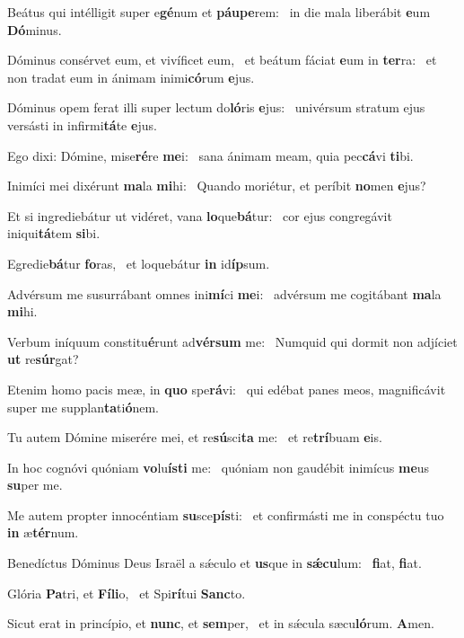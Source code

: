 \item Beátus qui intélligit super e\textbf{gé}num et \textbf{páu}\textbf{pe}rem:~\psstar{} in die mala liberábit \textbf{e}um \textbf{Dó}minus.
\item Dóminus consérvet eum, et vivíficet eum,~\pscross{} et beátum fáciat \textbf{e}um in \textbf{ter}ra:~\psstar{} et non tradat eum in ánimam inimi\textbf{có}rum \textbf{e}jus.
\item Dóminus opem ferat illi super lectum do\textbf{ló}ris \textbf{e}jus:~\psstar{} univérsum stratum ejus versásti in infirmi\textbf{tá}te \textbf{e}jus.
\item Ego dixi: Dómine, mise\textbf{ré}re \textbf{me}i:~\psstar{} sana ánimam meam, quia pec\textbf{cá}vi \textbf{ti}bi.
\item Inimíci mei dixérunt \textbf{ma}la \textbf{mi}hi:~\psstar{} Quando moriétur, et períbit \textbf{no}men \textbf{e}jus?
\item Et si ingrediebátur ut vidéret, vana \textbf{lo}que\textbf{bá}tur:~\psstar{} cor ejus congregávit iniqui\textbf{tá}tem \textbf{si}bi.
\item Egredie\textbf{bá}tur \textbf{fo}ras,~\psstar{} et loquebátur \textbf{in} id\textbf{íp}sum.
\item Advérsum me susurrábant omnes ini\textbf{mí}ci \textbf{me}i:~\psstar{} advérsum me cogitábant \textbf{ma}la \textbf{mi}hi.
\item Verbum iníquum constitu\textbf{é}runt ad\textbf{vér}\textbf{sum} me:~\psstar{} Numquid qui dormit non adjíciet \textbf{ut} re\textbf{súr}gat?
\item Etenim homo pacis meæ, in \textbf{quo} spe\textbf{rá}vi:~\psstar{} qui edébat panes meos, magnificávit super me supplan\textbf{ta}ti\textbf{ó}nem.
\item Tu autem Dómine miserére mei, et re\textbf{sú}sci\textbf{ta} me:~\psstar{} et re\textbf{trí}buam \textbf{e}is.
\item In hoc cognóvi quóniam \textbf{vo}lu\textbf{ís}\textbf{ti} me:~\psstar{} quóniam non gaudébit inimícus \textbf{me}us \textbf{su}per me.
\item Me autem propter innocéntiam \textbf{su}sce\textbf{pís}ti:~\psstar{} et confirmásti me in conspéctu tuo \textbf{in} æ\textbf{tér}num.
\item Benedíctus Dóminus Deus Israël a sǽculo et \textbf{us}que in \textbf{sǽ}\textbf{cu}lum:~\psstar{} \textbf{fi}at, \textbf{fi}at.
\item Glória \textbf{Pa}tri, et \textbf{Fí}\textbf{li}o,~\psstar{} et Spi\textbf{rí}tui \textbf{Sanc}to.
\item Sicut erat in princípio, et \textbf{nunc}, et \textbf{sem}per,~\psstar{} et in sǽcula sæcu\textbf{ló}rum. \textbf{A}men.